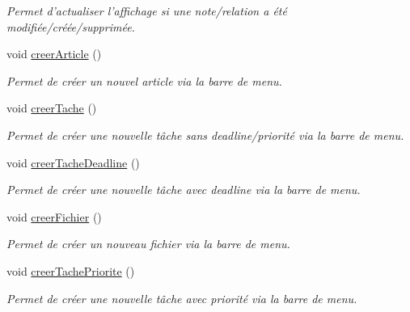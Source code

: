 \begin{DoxyCompactItemize}
\begin{DoxyCompactList}\small\item\em Permet d'actualiser l'affichage si une note/relation a été modifiée/créée/supprimée. \end{DoxyCompactList}\item 
\hypertarget{class_vue_principale_a2f77ec0647f3ac52ffedc0ad668f1646}{void \hyperlink{class_vue_principale_a2f77ec0647f3ac52ffedc0ad668f1646}{creer\-Article} ()}\label{class_vue_principale_a2f77ec0647f3ac52ffedc0ad668f1646}

\begin{DoxyCompactList}\small\item\em Permet de créer un nouvel article via la barre de menu. \end{DoxyCompactList}\item 
\hypertarget{class_vue_principale_a61157e05ff0f5e01ba286ab5cd374fd2}{void \hyperlink{class_vue_principale_a61157e05ff0f5e01ba286ab5cd374fd2}{creer\-Tache} ()}\label{class_vue_principale_a61157e05ff0f5e01ba286ab5cd374fd2}

\begin{DoxyCompactList}\small\item\em Permet de créer une nouvelle tâche sans deadline/priorité via la barre de menu. \end{DoxyCompactList}\item 
\hypertarget{class_vue_principale_a97ebca7d1567e54e1105b8fea1c1ca51}{void \hyperlink{class_vue_principale_a97ebca7d1567e54e1105b8fea1c1ca51}{creer\-Tache\-Deadline} ()}\label{class_vue_principale_a97ebca7d1567e54e1105b8fea1c1ca51}

\begin{DoxyCompactList}\small\item\em Permet de créer une nouvelle tâche avec deadline via la barre de menu. \end{DoxyCompactList}\item 
\hypertarget{class_vue_principale_aee6a12d4a49be4d8282421ad4de5d50f}{void \hyperlink{class_vue_principale_aee6a12d4a49be4d8282421ad4de5d50f}{creer\-Fichier} ()}\label{class_vue_principale_aee6a12d4a49be4d8282421ad4de5d50f}

\begin{DoxyCompactList}\small\item\em Permet de créer un nouveau fichier via la barre de menu. \end{DoxyCompactList}\item 
\hypertarget{class_vue_principale_a7d75be5c40167a67b69a91944210e299}{void \hyperlink{class_vue_principale_a7d75be5c40167a67b69a91944210e299}{creer\-Tache\-Priorite} ()}\label{class_vue_principale_a7d75be5c40167a67b69a91944210e299}

\begin{DoxyCompactList}\small\item\em Permet de créer une nouvelle tâche avec priorité via la barre de menu. \end{DoxyCompactList}\end{DoxyCompactItemize}
